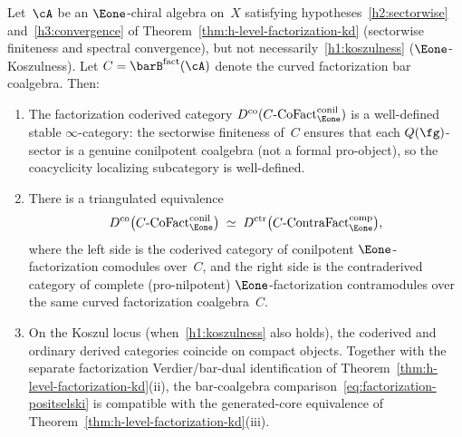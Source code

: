 \begin{theorem}
\label{thm:factorization-positselski}
Let~$\cA$ be an $\Eone$-chiral algebra on~$X$ satisfying
hypotheses~\ref{h2:sectorwise} and~\ref{h3:convergence} of
Theorem~\textup{\ref{thm:h-level-factorization-kd}}
\textup{(}sectorwise finiteness and spectral convergence\textup{)},
but not necessarily~\ref{h1:koszulness}
\textup{(}$\Eone$-Koszulness\textup{)}.
Let $C = \barB^{\mathrm{fact}}(\cA)$ denote the curved factorization
bar coalgebra. Then:
\begin{enumerate}[label=\textup{(\roman*)}]
\item The factorization coderived category
 $D^{\mathrm{co}}(C\text{-}\mathrm{CoFact}_{\Eone}^{\mathrm{conil}})$
 is a well-defined stable $\infty$-category: the sectorwise
 finiteness of~$C$ ensures that each $Q(\fg)$-sector is a
 genuine conilpotent coalgebra \textup{(}not a formal
 pro-object\textup{)}, so the coacyclicity localizing
 subcategory is well-defined.
 \item There is a triangulated equivalence
 \begin{equation}\label{eq:factorization-positselski}
 D^{\mathrm{co}}\bigl(
 C\text{-}\mathrm{CoFact}_{\Eone}^{\mathrm{conil}}
 \bigr)
 \;\simeq\;
 D^{\mathrm{ctr}}\bigl(
 C\text{-}\mathrm{ContraFact}_{\Eone}^{\mathrm{comp}}
 \bigr),
 \end{equation}
 where the left side is the coderived category of conilpotent
 $\Eone$-factorization comodules over~$C$, and the right side is
 the contraderived category of complete \textup{(}pro-nilpotent\textup{)}
 $\Eone$-factorization contramodules over the same curved
 factorization coalgebra~$C$.
\item On the Koszul locus \textup{(}when~\ref{h1:koszulness}
 also holds\textup{)}, the coderived and ordinary derived categories
 coincide on compact objects. Together with the separate
 factorization Verdier/bar-dual identification of
 Theorem~\textup{\ref{thm:h-level-factorization-kd}(ii)}, the
 bar-coalgebra comparison~\eqref{eq:factorization-positselski}
 is compatible with the generated-core equivalence of
 Theorem~\textup{\ref{thm:h-level-factorization-kd}(iii)}.
\end{enumerate}
\end{theorem}

